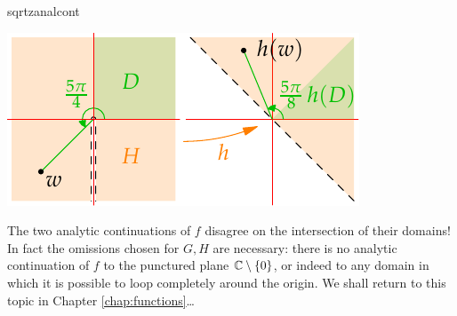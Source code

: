 \begin{example}{}{sqrtzanalcont}
\begin{minipage}[t]{0.38\linewidth}
		\includegraphics[scale=0.95]{analytic-cont2}
	\end{minipage}
	\medbreak
	The two analytic continuations of $f$ disagree on the intersection of their domains!\smallbreak
	In fact the omissions chosen for $G,H$ are necessary: there is no analytic continuation of $f$ to the punctured plane $\mathbb{C}\setminus\{0\}$, or indeed to any domain in which it is possible to loop completely around the origin. We shall return to this topic in Chapter \ref{chap:functions}\ldots
\end{example}

\goodbreak



